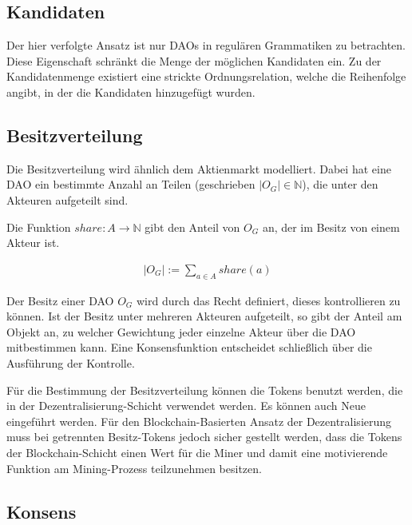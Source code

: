 \documentclass[a4paper,12pt]{report}
\begin{document}
\subsection{Kandidaten}
\label{kand}
Der hier verfolgte Ansatz ist nur DAOs in regulären Grammatiken zu betrachten. Diese Eigenschaft schränkt die Menge der möglichen Kandidaten ein. Zu der Kandidatenmenge existiert eine strickte Ordnungsrelation, welche die Reihenfolge angibt, in der die Kandidaten hinzugefügt wurden.

\subsection{Besitzverteilung}
\label{besitz}


Die Besitzverteilung wird ähnlich dem Aktienmarkt modelliert. Dabei hat eine DAO ein bestimmte Anzahl an Teilen (geschrieben $|O_G| \in \mathbb{N}$), die unter den Akteuren aufgeteilt sind. 

Die Funktion $share: A \rightarrow \mathbb{N}$ gibt den Anteil von $O_G$ an, der im Besitz von einem Akteur ist. 

\begin{eqnarray}
  |O_G| := \sum_{a \in A} share(a)
\end{eqnarray}

Der Besitz einer DAO $O_G$ wird durch das Recht definiert, dieses kontrollieren zu können\cite{Waldron2004}. Ist der Besitz unter mehreren Akteuren aufgeteilt, so gibt der Anteil am Objekt an, zu welcher Gewichtung jeder einzelne Akteur über die DAO mitbestimmen kann. Eine Konsensfunktion entscheidet schließlich über die Ausführung der Kontrolle.

Für die Bestimmung der Besitzverteilung können die Tokens benutzt werden, die in der Dezentralisierung-Schicht verwendet werden. Es können auch Neue eingeführt werden. Für den Blockchain-Basierten Ansatz der Dezentralisierung muss bei getrennten Besitz-Tokens jedoch sicher gestellt werden, dass die Tokens der Blockchain-Schicht einen Wert für die Miner und damit eine motivierende Funktion am Mining-Prozess teilzunehmen besitzen. 

% 




\subsection{Konsens}
\label{defkonsens}
\end{document}
